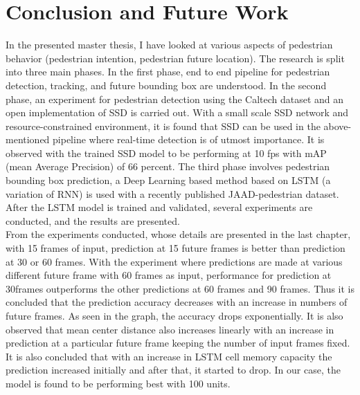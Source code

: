 
\chapter{Conclusion and Future Work}
In the presented master thesis, I have looked at various aspects of pedestrian behavior (pedestrian intention, pedestrian future location). The research is split into three main phases. In the first phase, end to end pipeline for pedestrian detection, tracking, and future bounding box are understood. In the second phase, an experiment for pedestrian detection using the Caltech dataset and an open implementation of SSD is carried out. With a small scale SSD network and resource-constrained environment, it is found that SSD can be used in the above-mentioned pipeline where real-time detection is of utmost importance. It is observed with the trained SSD model to be performing at 10  fps with mAP (mean Average Precision) of 66 percent. The third phase involves pedestrian bounding box prediction, a Deep Learning  based method based on LSTM (a variation of RNN) is used with a recently published JAAD-pedestrian dataset. After the LSTM model is trained and validated, several experiments are conducted, and the results are presented. \\

From the experiments conducted, whose details are presented in the last chapter, with 15 frames of input, prediction at 15 future frames is better than prediction at 30 or 60 frames. With the experiment where predictions are made at various different future frame with 60 frames as input, performance for prediction at 30frames outperforms the other predictions at 60 frames and 90 frames. Thus it is concluded that the prediction accuracy decreases with an increase in numbers of future frames. As seen in the graph, the accuracy drops exponentially. It is also observed that mean center distance also increases linearly with an increase in prediction at a particular future frame keeping the number of input frames fixed. \\

It is also concluded that with an increase in LSTM cell memory capacity the prediction increased initially and after that, it started to drop. In our case, the model is found to be performing best with 100 units. \\


